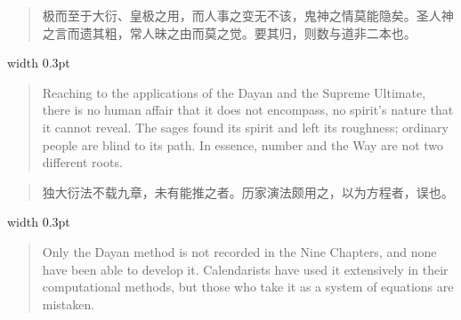\documentclass[10pt,a4paper]{article}
\newenvironment{prefacecn}{\begin{quote}\color{prefacecolor}\small}{\end{quote}}
\newenvironment{prefaceen}{\begin{quote}\color{prefacecolor}\small}{\end{quote}}
\begin{document}
\vspace{0.3em}

\noindent\begin{minipage}[t]{0.47\textwidth}
\begin{flushleft}
\begin{prefacecn}
极而至于大衍、皇极之用，而人事之变无不该，鬼神之情莫能隐矣。圣人神之言而遗其粗，常人昧之由而莫之觉。要其归，则数与道非二本也。
\end{prefacecn}
\end{flushleft}
\end{minipage}%
\hfill\vrule width 0.3pt\hfill%
\begin{minipage}[t]{0.47\textwidth}
\begin{flushleft}
\begin{prefaceen}
Reaching to the applications of the Dayan and the Supreme Ultimate, there is no human affair that it does not encompass, no spirit's nature that it cannot reveal. The sages found its spirit and left its roughness; ordinary people are blind to its path. In essence, number and the Way are not two different roots.
\end{prefaceen}
\end{flushleft}
\end{minipage}

\vspace{0.3em}

\noindent\begin{minipage}[t]{0.47\textwidth}
\begin{flushleft}
\begin{prefacecn}
独大衍法不载九章，未有能推之者。历家演法颇用之，以为方程者，误也。
\end{prefacecn}
\end{flushleft}
\end{minipage}%
\hfill\vrule width 0.3pt\hfill%
\begin{minipage}[t]{0.47\textwidth}
\begin{flushleft}
\begin{prefaceen}
Only the Dayan method is not recorded in the Nine Chapters, and none have been able to develop it. Calendarists have used it extensively in their computational methods, but those who take it as a system of equations are mistaken.
\end{prefaceen}
\end{flushleft}
\end{minipage}

\vspace{0.3em}
\end{document}
